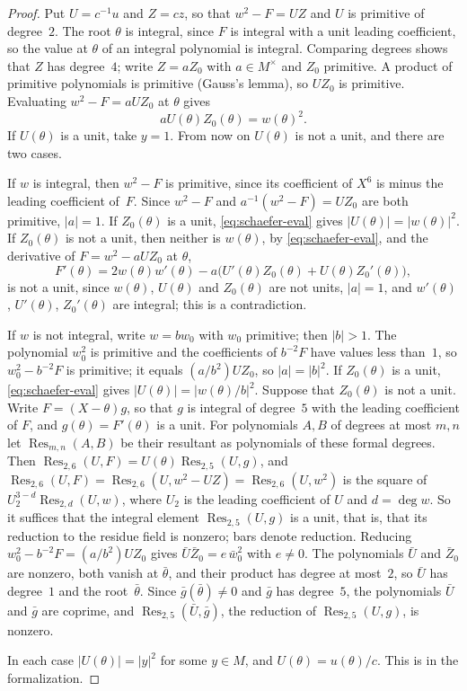 \documentclass[11pt]{amsart}
\theoremstyle{definition}
\numberwithin{equation}{section}
\newcommand{\Res}{\operatorname{Res}}
\begin{document}
\begin{proof}
Put $U=c^{-1}u$ and $Z=cz$, so that $w^2-F=UZ$ and $U$ is primitive of degree~$2$. The root $\theta$ is integral, since $F$ is integral with a unit leading coefficient, so the value at $\theta$ of an integral polynomial is integral. Comparing degrees shows that $Z$ has degree~$4$; write $Z=aZ_0$ with $a\in M^\times$ and $Z_0$ primitive. A product of primitive polynomials is primitive (Gauss's lemma), so $UZ_0$ is primitive. Evaluating $w^2-F=aUZ_0$ at $\theta$ gives
\begin{equation}\label{eq:schaefer-eval}
aU(\theta)Z_0(\theta)=w(\theta)^2 .
\end{equation}
If $U(\theta)$ is a unit, take $y=1$. From now on $U(\theta)$ is not a unit, and there are two cases.

If $w$ is integral, then $w^2-F$ is primitive, since its coefficient of $X^6$ is minus the leading coefficient of~$F$. Since $w^2-F$ and $a^{-1}(w^2-F)=UZ_0$ are both primitive, $|a|=1$. If $Z_0(\theta)$ is a unit, \eqref{eq:schaefer-eval} gives $|U(\theta)|=|w(\theta)|^2$. If $Z_0(\theta)$ is not a unit, then neither is $w(\theta)$, by \eqref{eq:schaefer-eval}, and the derivative of $F=w^2-aUZ_0$ at $\theta$,
\[
F'(\theta)=2w(\theta)w'(\theta)-a\bigl(U'(\theta)Z_0(\theta)+U(\theta)Z_0'(\theta)\bigr),
\]
is not a unit, since $w(\theta)$, $U(\theta)$ and $Z_0(\theta)$ are not units, $|a|=1$, and $w'(\theta)$, $U'(\theta)$, $Z_0'(\theta)$ are integral; this is a contradiction.

If $w$ is not integral, write $w=bw_0$ with $w_0$ primitive; then $|b|>1$. The polynomial $w_0^2$ is primitive and the coefficients of $b^{-2}F$ have values less than~$1$, so $w_0^2-b^{-2}F$ is primitive; it equals $(a/b^2)UZ_0$, so $|a|=|b|^2$. If $Z_0(\theta)$ is a unit, \eqref{eq:schaefer-eval} gives $|U(\theta)|=|w(\theta)/b|^2$. Suppose that $Z_0(\theta)$ is not a unit. Write $F=(X-\theta)g$, so that $g$ is integral of degree~$5$ with the leading coefficient of $F$, and $g(\theta)=F'(\theta)$ is a unit. For polynomials $A,B$ of degrees at most $m,n$ let $\Res_{m,n}(A,B)$ be their resultant as polynomials of these formal degrees. Then $\Res_{2,6}(U,F)=U(\theta)\Res_{2,5}(U,g)$, and $\Res_{2,6}(U,F)=\Res_{2,6}(U,w^2-UZ)=\Res_{2,6}(U,w^2)$ is the square of $U_2^{3-d}\Res_{2,d}(U,w)$, where $U_2$ is the leading coefficient of $U$ and $d=\deg w$. So it suffices that the integral element $\Res_{2,5}(U,g)$ is a unit, that is, that its reduction to the residue field is nonzero; bars denote reduction. Reducing $w_0^2-b^{-2}F=(a/b^2)UZ_0$ gives $\bar U\bar Z_0=e\,\bar w_0^2$ with $e\neq0$. The polynomials $\bar U$ and $\bar Z_0$ are nonzero, both vanish at $\bar\theta$, and their product has degree at most~$2$, so $\bar U$ has degree~$1$ and the root~$\bar\theta$. Since $\bar g(\bar\theta)\neq0$ and $\bar g$ has degree~$5$, the polynomials $\bar U$ and $\bar g$ are coprime, and $\Res_{2,5}(\bar U,\bar g)$, the reduction of $\Res_{2,5}(U,g)$, is nonzero.

In each case $|U(\theta)|=|y|^2$ for some $y\in M$, and $U(\theta)=u(\theta)/c$. This is  in the formalization.
\end{proof}
\end{document}
